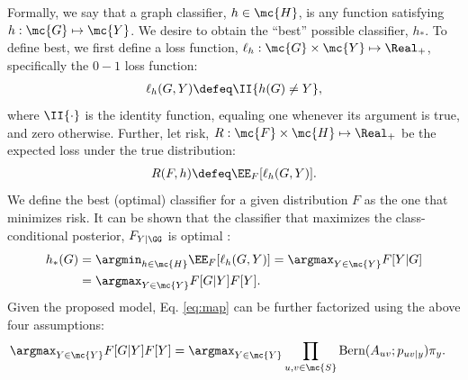 \documentclass[10pt,journal,cspaper,compsoc]{IEEEtran}
\begin{document}
Formally, we say that a graph classifier, $h \in \mc{H}$, is any function satisfying $h: \mc{G} \mapsto \mc{Y}$.  We desire to obtain the ``best'' possible classifier, $h_*$. To define best, we first define a loss function, $\ell_h: \mc{G} \times \mc{Y} \mapsto \Real_+$, specifically the $0-1$ loss function:
\begin{align}
\ell_h(G,Y) \defeq \II \{h(G) \neq Y\}, %
\end{align}
where $\II\{\cdot\}$ is the identity function, equaling one whenever its argument is true, and zero otherwise.  Further, let risk, $R: \mc{F} \times \mc{H} \mapsto \Real_+$ be the expected loss under the true distribution:
\begin{align}
R(F,h) \defeq \EE_F[\ell_h(G,Y)].
\end{align}
We define the best (optimal) classifier for a given distribution $F$ as the one that minimizes risk.
It can be shown that the classifier that maximizes the class-conditional posterior, $F_{Y | \GG}$ is optimal \cite{Bickel2000}:
\begin{align} \label{eq:map}
h_*(G) &= \argmin_{h \in \mc{H}} \EE_F[\ell_h (G,Y)] = \argmax_{Y \in \mc{Y}} F[Y|G] 
\nonumber \\ &= \argmax_{Y \in \mc{Y}} F[G|Y] F[Y].
\end{align}
Given the proposed model, Eq. \eqref{eq:map} can be further factorized using the above four assumptions:
\begin{align}
\argmax_{Y \in \mc{Y}} F[G|Y] F[Y] 
&= \argmax_{Y \in \mc{Y}} \prod_{u,v \in \mc{S}} \text{Bern}(A_{uv}; p_{uv|y}) \pi_y.
\end{align}
\end{document}

